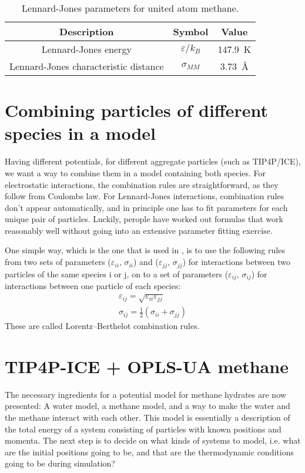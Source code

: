 \begin{table}
\caption{Lennard-Jones parameters for united atom methane.}
\label{tb:parameters_unitedatommethane}
\begin{center}
\begin{tabular}{c|c|c}
Description & Symbol & Value \\
\hline
Lennard-Jones energy & $\varepsilon/k_B$ & \SI{147.9}{\kelvin} \\
Lennard-Jones characteristic distance & $\sigma_{MM}$ & \SI{3.73}{\angstrom}
\end{tabular}
\end{center}
\end{table}



\section{Combining particles of different species in a model}
Having different potentials, for different aggregate particles (such as TIP4P/ICE), we want a way to combine them in a model containing both species. For electrostatic interactions, the combination rules are straightforward, as they follow from Coulombs law. For Lennard-Jones interactions, combination rules don't appear automatically, and in principle one has to fit parameters for each unique pair of particles. Luckily, perople have worked out formulas that work reasonably well without going into an extensive parameter fitting exercise. 

One simple way, which is the one that is used in \citet{Walsh2009}, is to use the following rules from two sets of parameters ($\varepsilon_{ii}$, $\sigma_{ii}$) and ($\varepsilon_{jj}$, $\sigma_{jj}$) for interactions between two particles of the same species i or j, on to a set of parameters ($\varepsilon_{ij}$, $\sigma_{ij}$) for interactions between one particle of each species:
\begin{align}
\varepsilon_{ij} = \sqrt{\varepsilon_{ii}\varepsilon_{jj}} \\
\sigma_{ij} = \frac{1}{2} \left(\sigma_{ii}+\sigma_{jj}\right)
\end{align}
These are called Lorentz--Berthelot combination rules.

\section{TIP4P-ICE + OPLS-UA methane}
The necessary ingredients for a potential model for methane hydrates are now presented: A water model, a methane model, and a way to make the water and the methane interact with each other. This model is essentially a description of the total energy of a system consisting of particles with known positions and momenta. The next step is to decide on what kinds of systems to model, i.e. what are the initial positions going to be, and that are the thermodynamic conditions going to be during simulation?

